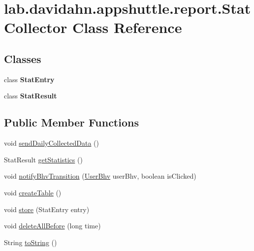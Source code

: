 \hypertarget{classlab_1_1davidahn_1_1appshuttle_1_1report_1_1_stat_collector}{\section{lab.\-davidahn.\-appshuttle.\-report.\-Stat\-Collector \-Class \-Reference}
\label{classlab_1_1davidahn_1_1appshuttle_1_1report_1_1_stat_collector}
}
\subsection*{\-Classes}
\begin{DoxyCompactItemize}
\item 
class {\bfseries \-Stat\-Entry}
\item 
class {\bfseries \-Stat\-Result}
\end{DoxyCompactItemize}
\subsection*{\-Public \-Member \-Functions}
\begin{DoxyCompactItemize}
\item 
void \hyperlink{classlab_1_1davidahn_1_1appshuttle_1_1report_1_1_stat_collector_a0d139c9ddb7eee1867461ee31fadf64e}{send\-Daily\-Collected\-Data} ()
\item 
\-Stat\-Result \hyperlink{classlab_1_1davidahn_1_1appshuttle_1_1report_1_1_stat_collector_af16a9fee40a05c26dd32a778b91e45c3}{get\-Statistics} ()
\item 
void \hyperlink{classlab_1_1davidahn_1_1appshuttle_1_1report_1_1_stat_collector_a5bd75c6d139e4eca7332a424e2d346bc}{notify\-Bhv\-Transition} (\hyperlink{interfacelab_1_1davidahn_1_1appshuttle_1_1collect_1_1bhv_1_1_user_bhv}{\-User\-Bhv} user\-Bhv, boolean is\-Clicked)
\item 
void \hyperlink{classlab_1_1davidahn_1_1appshuttle_1_1report_1_1_stat_collector_a0f85a2d31bd00ca152cd92d5e87f3110}{create\-Table} ()
\item 
void \hyperlink{classlab_1_1davidahn_1_1appshuttle_1_1report_1_1_stat_collector_acb89a85d7cce76edf4a8da2b80e6e300}{store} (\-Stat\-Entry entry)
\item 
void \hyperlink{classlab_1_1davidahn_1_1appshuttle_1_1report_1_1_stat_collector_ac87681fbcf8744c96e0ace5eb5570a61}{delete\-All\-Before} (long time)
\item 
\-String \hyperlink{classlab_1_1davidahn_1_1appshuttle_1_1report_1_1_stat_collector_a65c6125f25008af07c7e7983cb3e4084}{to\-String} ()
\end{DoxyCompactItemize}
